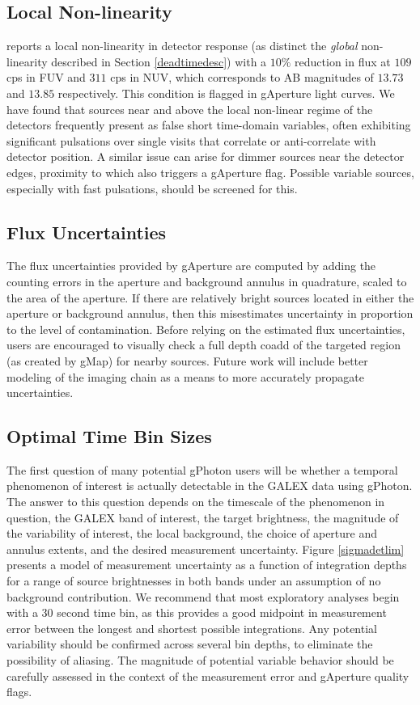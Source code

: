 \documentclass[iop]{emulateapj}
\begin{document}
\subsection{Local Non-linearity}
\label{nonlinear}
\citet{mor2007} reports a local non-linearity in detector response (as distinct the \emph{global} non-linearity described in Section \ref{deadtimedesc}) with a $10\%$ reduction in flux at $109$ cps in FUV and $311$ cps in NUV, which corresponds to AB magnitudes of $13.73$ and $13.85$ respectively. This condition is flagged in gAperture light curves. We have found that sources near and above the local non-linear regime of the detectors frequently present as false short time-domain variables, often exhibiting significant pulsations over single visits that correlate or anti-correlate with detector position. A similar issue can arise for dimmer sources near the detector edges, proximity to which also triggers a gAperture flag. Possible variable sources, especially with fast pulsations, should be screened for this.

\subsection{Flux Uncertainties}
\label{fluxuncert}
The flux uncertainties provided by gAperture are computed by adding the counting errors in the aperture and background annulus in quadrature, scaled to the area of the aperture. If there are relatively bright sources located in either the aperture or background annulus, then this misestimates uncertainty in proportion to the level of contamination. Before relying on the estimated flux uncertainties, users are encouraged to visually check a full depth coadd of the targeted region (as created by gMap) for nearby sources. Future work will include better modeling of the imaging chain as a means to more accurately propagate uncertainties.

\subsection{Optimal Time Bin Sizes}
\label{optbinsize}
The first question of many potential gPhoton users will be whether a temporal phenomenon of interest is actually detectable in the GALEX data using gPhoton. The answer to this question depends on the timescale of the phenomenon in question, the GALEX band of interest, the target brightness, the magnitude of the variability of interest, the local background, the choice of aperture and annulus extents, and the desired measurement uncertainty. Figure \ref{sigmadetlim} presents a model of measurement uncertainty as a function of integration depths for a range of source brightnesses in both bands under an assumption of no background contribution. We recommend that most exploratory analyses begin with a 30 second time bin, as this provides a good midpoint in measurement error between the longest and shortest possible integrations. Any potential variability should be confirmed across several bin depths, to eliminate the possibility of aliasing. The magnitude of potential variable behavior should be carefully assessed in the context of the measurement error and gAperture quality flags.
\end{document}
